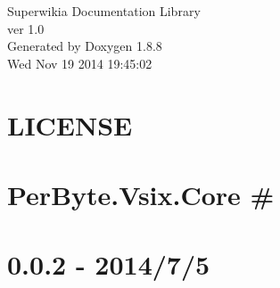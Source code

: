 \documentclass[twoside]{book}
\newcommand{\+}{\discretionary{\mbox{\scriptsize$\hookleftarrow$}}{}{}}
\newcommand{\clearemptydoublepage}{%
  \newpage{\pagestyle{empty}\cleardoublepage}%
}
\begin{document}
\hypersetup{pageanchor=false,
             bookmarks=true,
             bookmarksnumbered=true,
             pdfencoding=unicode
            }
\begin{titlepage}
\vspace*{7cm}
\begin{center}%
{\Large Superwikia Documentation Library \\[1ex]\large ver 1.\+0 }\\
\vspace*{1cm}
{\large Generated by Doxygen 1.8.8}\\
\vspace*{0.5cm}
{\small Wed Nov 19 2014 19:45:02}\\
\end{center}
\end{titlepage}
\clearemptydoublepage
\tableofcontents
\clearemptydoublepage
{}
\hypersetup{pageanchor=true}

\chapter{L\+I\+C\+E\+N\+S\+E}
\label{de/d22/md__c_1__users__stacy__staples__documents__git_hub__superwikia-_alpha-_codebase__superwikia-_docb53dc9ff4f52331a3abb7d5960433ec5}
\hypertarget{de/d22/md__c_1__users__stacy__staples__documents__git_hub__superwikia-_alpha-_codebase__superwikia-_docb53dc9ff4f52331a3abb7d5960433ec5}{}

\chapter{Per\+Byte.\+Vsix.\+Core \#}
\label{dc/dff/md__c_1__users__stacy__staples__documents__git_hub__superwikia-_alpha-_codebase__superwikia-_doc524ffebee77013a7c052e8d2fb0f4ac5}
\hypertarget{dc/dff/md__c_1__users__stacy__staples__documents__git_hub__superwikia-_alpha-_codebase__superwikia-_doc524ffebee77013a7c052e8d2fb0f4ac5}{}

\chapter{0.0.2 -\/ 2014/7/5}
\label{d4/deb/md__c_1__users__stacy__staples__documents__git_hub__superwikia-_alpha-_codebase__superwikia-_doc9bf66b55928cdc0114819f6df53937b2}
\hypertarget{d4/deb/md__c_1__users__stacy__staples__documents__git_hub__superwikia-_alpha-_codebase__superwikia-_doc9bf66b55928cdc0114819f6df53937b2}{}

\end{document}
